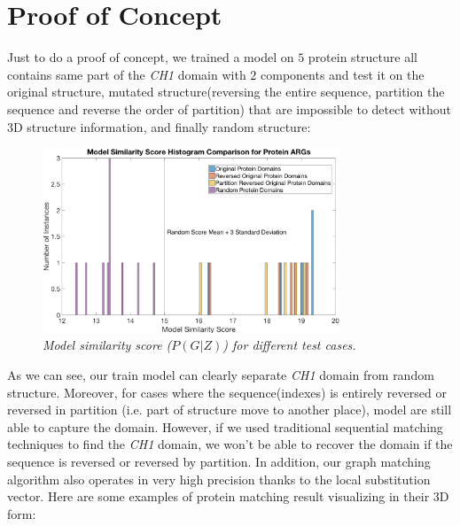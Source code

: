 \section{Proof of Concept\protect\footnotemark}
\label{sec:poc}

Just to do a proof of concept, we trained a model on $5$ protein structure all contains same part of the \emph{CH1} domain with $2$ components and test it on the original structure, mutated structure(reversing the entire sequence, partition the sequence and reverse the order of partition) that are impossible to detect without 3D structure information, and finally random structure:

\begin{figure}[h]
	\centering
	\captionsetup{justification=centering}
	\includegraphics[width=0.79\textwidth]{figs/protein_learning.png}
	\caption[Caption for LOF]{\emph{Model similarity score ($P(G|Z)$) for different test cases.}}
	\label{fig:protein_learning}
\end{figure}

As we can see, our train model can clearly separate \emph{CH1} domain from random structure. Moreover, for cases where the sequence(indexes) is entirely reversed or reversed in partition (i.e. part of structure move to another place), model are still able to capture the domain. However, if we used traditional sequential matching techniques to find the \emph{CH1} domain, we won't be able to recover the domain if the sequence is reversed or reversed by partition. In addition, our graph matching algorithm also operates in very high precision thanks to the local substitution vector. Here are some examples of protein matching result visualizing in their 3D form:\\

